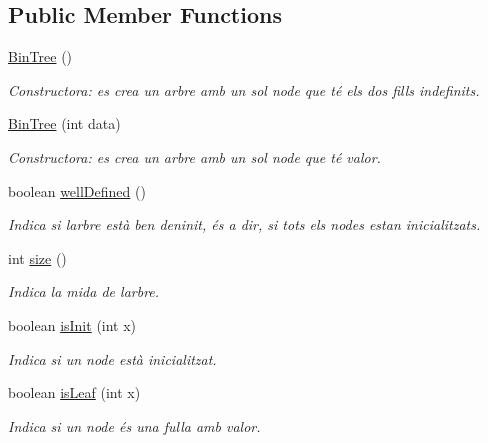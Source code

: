 \subsection*{Public Member Functions}
\begin{DoxyCompactItemize}
\item 
\hyperlink{classdomini_1_1utils_1_1BinTree_a46082da82a1186c5a99ae68eee6ece13}{Bin\+Tree} ()
\begin{DoxyCompactList}\small\item\em Constructora\+: es crea un arbre amb un sol node que té els dos fills indefinits. \end{DoxyCompactList}\item 
\hyperlink{classdomini_1_1utils_1_1BinTree_a83904c6ebf931ba29a134be5f29a66c7}{Bin\+Tree} (int data)
\begin{DoxyCompactList}\small\item\em Constructora\+: es crea un arbre amb un sol node que té valor. \end{DoxyCompactList}\item 
boolean \hyperlink{classdomini_1_1utils_1_1BinTree_a30f097b37ebea20379d9c2930e8fa27f}{well\+Defined} ()
\begin{DoxyCompactList}\small\item\em Indica si l\textquotesingle{}arbre està ben deninit, és a dir, si tots els nodes estan inicialitzats. \end{DoxyCompactList}\item 
int \hyperlink{classdomini_1_1utils_1_1BinTree_afb98cb560c437784fe3ce1b8d6aa046e}{size} ()
\begin{DoxyCompactList}\small\item\em Indica la mida de l\textquotesingle{}arbre. \end{DoxyCompactList}\item 
boolean \hyperlink{classdomini_1_1utils_1_1BinTree_aefcc4df5059f9893eba9998cb267eced}{is\+Init} (int x)
\begin{DoxyCompactList}\small\item\em Indica si un node està inicialitzat. \end{DoxyCompactList}\item 
boolean \hyperlink{classdomini_1_1utils_1_1BinTree_a37030e961f5613a5c74984ac002d965b}{is\+Leaf} (int x)
\begin{DoxyCompactList}\small\item\em Indica si un node és una fulla amb valor. \end{DoxyCompactList}\item 

\end{DoxyCompactItemize}
